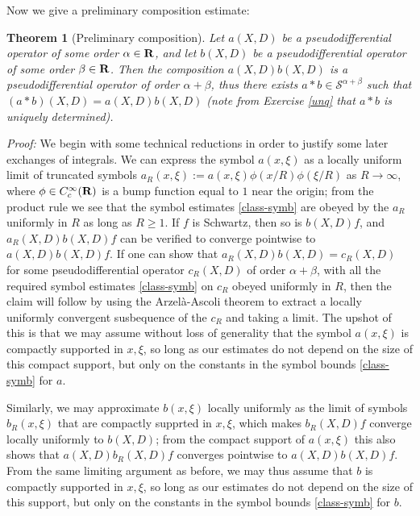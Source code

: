 \documentclass[11pt]{article}
\newtheorem{theorem}{Theorem}
\theoremstyle{definition}
\theoremstyle{remark}
\begin{document}
Now we give a preliminary composition estimate:

\begin{theorem}[Preliminary composition]
 \label{precomp} Let \({a(X,D)}\) be a pseudodifferential operator of some order \({\alpha \in {\bf R}}\), and let \({b(X,D)}\) be a pseudodifferential operator of some order \({\beta \in {\bf R}}\). Then the composition \({a(X,D) b(X,D)}\) is a pseudodifferential operator of order \({\alpha+\beta}\), thus there exists \({a*b \in {\mathcal S}^{\alpha+\beta}}\) such that \({(a*b)(X,D) = a(X,D) b(X,D)}\) (note from Exercise \ref{unq} that \({a*b}\) is uniquely determined). 
\end{theorem}

\emph{Proof:}  We begin with some technical reductions in order to justify some later exchanges of integrals. We can express the symbol \({a(x,\xi)}\) as a locally uniform limit of truncated symbols \({a_R(x,\xi) := a(x,\xi) \phi(x/R) \phi(\xi/R)}\) as \({R \rightarrow \infty}\), where \({\phi \in C^\infty_c({\bf R})}\) is a bump function equal to \({1}\) near the origin; from the product rule we see that the symbol estimates \eqref{class-symb} are obeyed by the \({a_R}\) uniformly in \({R}\) as long as \({R \geq 1}\). If \({f}\) is Schwartz, then so is \({b(X,D) f}\), and \({a_R(X,D) b(X,D) f}\) can be verified to converge pointwise to \({a(X,D) b(X,D) f}\). If one can show that \({a_R(X,D) b(X,D) = c_R(X,D)}\) for some pseudodifferential operator \({c_R(X,D)}\) of order \({\alpha+\beta}\), with all the required symbol estimates \eqref{class-symb} on \({c_R}\) obeyed uniformly in \({R}\), then the claim will follow by using the Arzelà-Ascoli theorem to extract a locally uniformly convergent susbequence of the \({c_R}\) and taking a limit. The upshot of this is that we may assume without loss of generality that the symbol \({a(x,\xi)}\) is compactly supported in \({x,\xi}\), so long as our estimates do not depend on the size of this compact support, but only on the constants in the symbol bounds \eqref{class-symb} for \({a}\).


Similarly, we may approximate \({b(x,\xi)}\) locally uniformly as the limit of symbols \({b_R(x,\xi)}\) that are compactly supprted in \({x,\xi}\), which makes \({b_R(X,D) f}\) converge locally uniformly to \({b(X,D)}\); from the compact support of \({a(x,\xi)}\) this also shows that \({a(X,D) b_R(X,D) f}\) converges pointwise to \({a(X,D) b(X,D) f}\). From the same limiting argument as before, we may thus assume that \({b}\) is compactly supported in \({x,\xi}\), so long as our estimates do not depend on the size of this support, but only on the constants in the symbol bounds \eqref{class-symb} for \({b}\).
\end{document}
